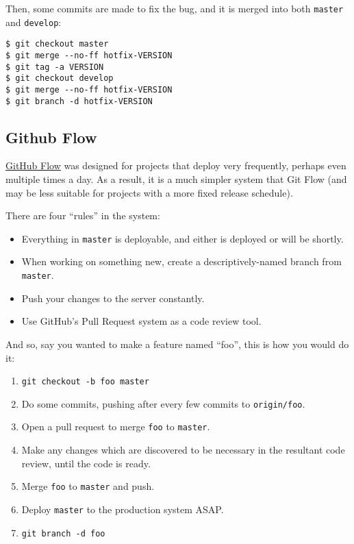 \documentclass[12pt,a4paper]{article}
\begin{document}
Then, some commits are made to fix the bug, and it is merged into both
\texttt{master} and \texttt{develop}:

\begin{verbatim}
$ git checkout master
$ git merge --no-ff hotfix-VERSION
$ git tag -a VERSION
$ git checkout develop
$ git merge --no-ff hotfix-VERSION
$ git branch -d hotfix-VERSION
\end{verbatim}

\subsection{Github Flow}

\href{http://scottchacon.com/2011/08/31/github-flow.html}{GitHub Flow}
was designed for projects that deploy very frequently, perhaps even
multiple times a day. As a result, it is a much simpler system that
Git Flow (and may be less suitable for projects with a more fixed
release schedule).

There are four ``rules'' in the system:

\begin{itemize}
  \item Everything in \texttt{master} is deployable, and either is
    deployed or will be shortly.
  \item When working on something new, create a descriptively-named
    branch from \texttt{master}.
  \item Push your changes to the server constantly.
  \item Use GitHub's Pull Request system as a code review tool.
\end{itemize}

And so, say you wanted to make a feature named ``foo'', this is how
you would do it:

\begin{enumerate}
  \item \texttt{git checkout -b foo master}
  \item Do some commits, pushing after every few commits to
    \texttt{origin/foo}.
  \item Open a pull request to merge \texttt{foo} to \texttt{master}.
  \item Make any changes which are discovered to be necessary in the
    resultant code review, until the code is ready.
  \item Merge \texttt{foo} to \texttt{master} and push.
  \item Deploy \texttt{master} to the production system ASAP.
  \item \texttt{git branch -d foo}
\end{enumerate}
\end{document}
